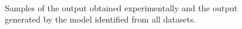 \documentclass[a4paper,11pt,twoside]{article}
\theoremstyle{mytheoremstyle}
\begin{document}
\begin{figure}[!h]
	\centering
	\subfloat[C3]{\label{fig:c3all}}\\
	\subfloat[C8]{\label{fig:c8all}}
	\caption{Samples of the output obtained experimentally and the output generated by the model identified from all datasets.}\label{fig:Betas_direct_all}
\end{figure}
\printbibliography
\end{document}
